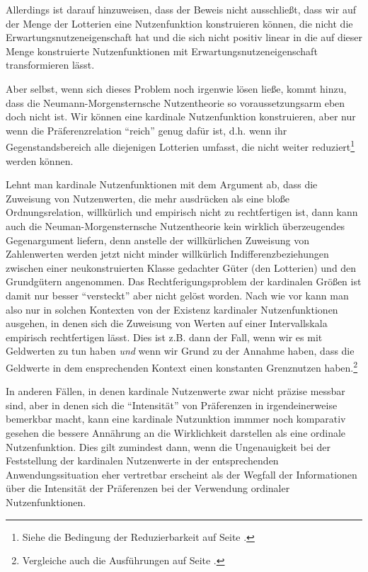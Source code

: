 Allerdings ist darauf hinzuweisen, dass der Beweis nicht ausschließt, dass wir
auf der Menge der Lotterien eine Nutzenfunktion konstruieren können, die nicht
die Erwartungsnutzeneigenschaft hat und die sich nicht positiv linear in die auf
dieser Menge konstruierte Nutzenfunktionen mit Erwartungsnutzeneigenschaft
transformieren lässt.

Aber selbst, wenn sich dieses Problem noch irgenwie lösen ließe, kommt hinzu,
dass die Neumann-Morgensternsche Nutzentheorie so voraussetzungsarm eben
doch nicht ist. Wir können eine kardinale Nutzenfunktion konstruieren, aber nur
wenn die Präferenzrelation "`reich"' genug dafür ist, d.h. wenn ihr
Gegenstandsbereich alle diejenigen Lotterien umfasst, die nicht weiter
reduziert\footnote{Siehe die Bedingung der Reduzierbarkeit auf Seite
\pageref{Reduzierbarkeit}.} werden können.

Lehnt man kardinale Nutzenfunktionen mit dem Argument ab, dass die Zuweisung von
Nutzenwerten, die mehr ausdrücken als eine bloße Ordnungsrelation, willkürlich
und empirisch nicht zu rechtfertigen ist, dann kann auch die
Neuman-Morgensternsche Nutzentheorie kein wirklich überzeugendes Gegenargument
liefern, denn anstelle der willkürlichen Zuweisung von Zahlenwerten werden jetzt
nicht minder willkürlich Indifferenzbeziehungen zwischen einer neukonstruierten
Klasse gedachter Güter (den Lotterien) und den Grundgütern angenommen. Das
Rechtferigungsproblem der kardinalen Größen ist damit nur besser "`versteckt"'
aber nicht gelöst worden. Nach wie vor kann man also nur in solchen Kontexten von
der Existenz kardinaler Nutzenfunktionen ausgehen, in denen sich die Zuweisung
von Werten auf einer Intervallskala empirisch rechtfertigen lässt. Dies ist z.B.
dann der Fall, wenn wir es mit Geldwerten zu tun haben {\em und} wenn wir Grund
zu der Annahme haben, dass die Geldwerte in dem ensprechenden Kontext einen
konstanten Grenznutzen haben.\footnote{Vergleiche auch die Ausführungen auf Seite
\pageref{RisikoaversionGrenznutzen}.} 

In anderen Fällen, in denen kardinale
Nutzenwerte zwar nicht präzise messbar sind, aber in denen sich die
``Intensität'' von Präferenzen in irgendeinerweise bemerkbar macht, kann eine
kardinale Nutzunktion immmer noch komparativ gesehen die bessere Annährung
an die Wirklichkeit darstellen als eine ordinale Nutzenfunktion. Dies gilt
zumindest dann, wenn die Ungenauigkeit bei der Feststellung der kardinalen
Nutzenwerte in der entsprechenden Anwendungssituation eher vertretbar erscheint
als der Wegfall der Informationen über die Intensität der Präferenzen bei der
Verwendung ordinaler Nutzenfunktionen.

